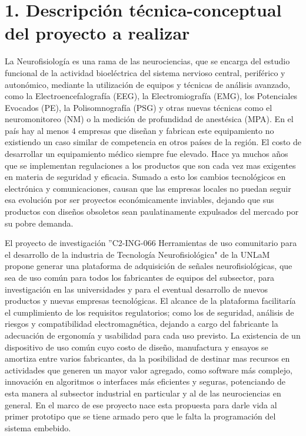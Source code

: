 \documentclass[
11pt, %
codirector, %
]{charter}
\begin{document}
\section{1. Descripción técnica-conceptual del proyecto a realizar}
\label{sec:descripcion}


La Neurofisiología es una rama de las neurociencias, que se encarga del estudio funcional de la actividad bioeléctrica del sistema nervioso central, periférico y autonómico, mediante la utilización de equipos y técnicas de análisis avanzado, como la Electroencefalografía (EEG), la Electromiografía (EMG), los Potenciales Evocados (PE), la Polisomnografía (PSG) y otras nuevas técnicas como el neuromonitoreo (NM) o la medición de profundidad de anestésica (MPA). En el país hay al menos 4 empresas que diseñan y fabrican este equipamiento no existiendo un caso similar de competencia en otros países de la región. El costo de desarrollar un equipamiento médico siempre fue elevado. Hace ya muchos años que se implementan regulaciones a los productos que son cada vez mas exigentes en materia de seguridad y eficacia. Sumado a esto los cambios tecnológicos en electrónica y comunicaciones, causan que las empresas locales no puedan seguir esa evolución por ser proyectos económicamente inviables, dejando que sus productos con diseños obsoletos sean paulatinamente expulsados del mercado por su pobre demanda. 

El proyecto de investigación ''C2-ING-066 Herramientas de uso comunitario para el desarrollo de la industria de Tecnología Neurofisiológica" de la UNLaM propone generar una plataforma de adquisición de señales neurofisiológicas, que sea de uso común para todos los fabricantes de equipos del subsector, para investigación en las universidades y para el eventual desarrollo de nuevos productos y nuevas empresas tecnológicas. El alcance de la plataforma facilitaría el cumplimiento de los requisitos regulatorios; como los de seguridad, análisis de riesgos y compatibilidad electromagnética, dejando a cargo del fabricante la adecuación de ergonomía y usabilidad para cada uso previsto. La existencia de un dispositivo de uso común cuyo costo de diseño, manufactura y ensayos se amortiza entre varios fabricantes, da la posibilidad de destinar mas recursos en actividades que generen un mayor valor agregado, como software más complejo, innovación en algoritmos o interfaces más eficientes y seguras, potenciando de esta manera al subsector industrial en particular y al de las neurociencias en general. En el marco de ese proyecto nace esta propuesta para darle vida al primer prototipo que se tiene armado pero que le falta la programación del sistema embebido.
\end{document}
